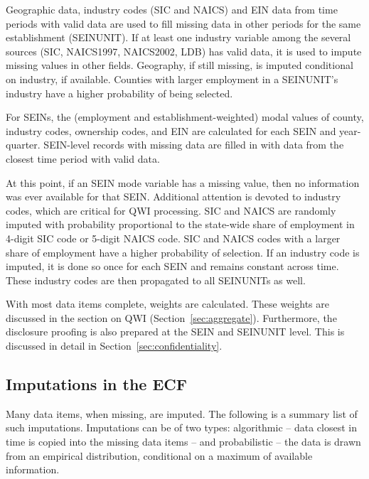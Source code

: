 Geographic data, industry codes (SIC and NAICS) and EIN data
 from  time periods with valid data are used to fill  missing data
in other periods for the same establishment (SEINUNIT). If at least one
industry variable among the several sources (SIC, NAICS1997, NAICS2002,
LDB) has valid data, it is used to impute missing values in other fields.
Geography, if still missing, is imputed
conditional on industry, if available. Counties with larger employment in a
SEINUNIT's industry have a higher probability of being selected.

For SEINs, the (employment and establishment-weighted) modal values
of county, industry codes, ownership codes, and EIN are calculated for each
SEIN and year-quarter. SEIN-level records with missing data are filled in
with data from the closest time period with valid data.

At this point, if an SEIN mode variable has a missing value, then no
information was ever available for that SEIN. Additional attention is
devoted to  industry codes, which
are critical for QWI processing. 
% 
%
SIC and NAICS are randomly imputed with probability proportional to the
state-wide share of employment in 4-digit SIC code or 5-digit NAICS
code. SIC and NAICS codes with a larger share of employment have a higher
probability of selection. 
%
If an industry code is imputed, it is done so once for each SEIN and
remains constant across time. These industry codes are then propagated to
all SEINUNITs as well.

With most data items complete, weights are calculated. These weights are
discussed in the section on QWI (Section~\ref{sec:aggregate}). Furthermore,
the disclosure proofing is also prepared at the SEIN and SEINUNIT
level. This is discussed in detail in Section~\ref{sec:confidentiality}. 


\subsection{Imputations in the ECF}
\label{sec:ecf:impute}

Many data items, when missing, are imputed. The following is a summary list
of such imputations. Imputations can be of two types: algorithmic -- data
closest in time is copied into the  missing data items -- and probabilistic
-- the data is drawn from an empirical distribution, conditional on a
maximum of available information.

